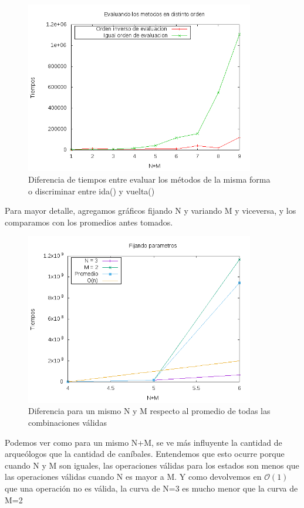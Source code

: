\begin{figure}[H]
    \centering
    \includegraphics[width=10cm]{./imagenes/tiemposEj1Cambiados.png}
    \caption{Diferencia de tiempos entre evaluar los métodos de la misma forma o discriminar entre ida() y vuelta()}
\end{figure}

Para mayor detalle, agregamos gráficos fijando N y variando M y viceversa, y los comparamos con los promedios antes tomados.

\begin{figure}[H]
    \centering
    \includegraphics[width=10cm]{./imagenes/fijos.png}
    \caption{Diferencia para un mismo N y M respecto al promedio de todas las combinaciones válidas}
\end{figure}

Podemos ver como para un mismo N+M, se ve m\'as influyente la cantidad de arque\'ologos que la cantidad de can\'ibales. Entendemos que esto ocurre porque cuando N y M son iguales, las operaciones v\'alidas para los estados son menos que las operaciones v\'alidas cuando N es mayor a M. Y como devolvemos en $\mathcal{O}(1)$ que una operaci\'on no es v\'alida, la curva de N=3 es mucho menor que la curva de M=2